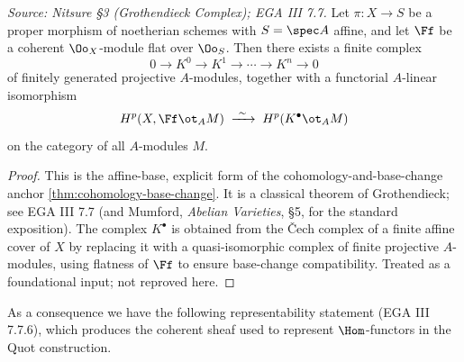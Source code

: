 \begin{theorem}
  \label{thm:grothendieck-complex}
  \textit{Source: Nitsure §3 (Grothendieck Complex); EGA III 7.7.}
  Let $\pi\colon X\to S$ be a proper morphism of noetherian schemes with
  $S=\spec A$ affine, and let $\Ff$ be a coherent $\Oo_X$-module flat over
  $\Oo_S$. Then there exists a finite complex
  \[
    0\to K^0\to K^1\to\cdots\to K^n\to 0
  \]
  of finitely generated projective $A$-modules, together with a functorial
  $A$-linear isomorphism
  \[
    H^p(X,\Ff\ot_A M)\;\xrightarrow{\ \sim\ }\;H^p(K^\bullet\ot_A M)
  \]
  on the category of all $A$-modules $M$.
\end{theorem}

\begin{proof}
  \leanok
  This is the affine-base, explicit form of the cohomology-and-base-change anchor
  \cref{thm:cohomology-base-change}. It is a classical theorem of Grothendieck;
  see EGA III 7.7 (and Mumford, \emph{Abelian Varieties}, §5, for the standard
  exposition). The complex $K^\bullet$ is obtained from the \v{C}ech complex of a
  finite affine cover of $X$ by replacing it with a quasi-isomorphic complex of
  finite projective $A$-modules, using flatness of $\Ff$ to ensure base-change
  compatibility. Treated as a foundational input; not reproved here.
\end{proof}

As a consequence we have the following representability statement (EGA III
7.7.6), which produces the coherent sheaf used to represent $\Hom$-functors in
the Quot construction.

